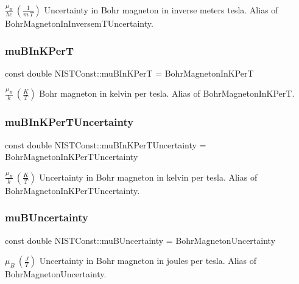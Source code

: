$\frac{\mu_B}{hc} \ (\frac{1}{m\ T})$ Uncertainty in Bohr magneton in inverse meters tesla. Alias of Bohr\+Magneton\+In\+Inversem\+T\+Uncertainty. \mbox{\label{group___bohr_magneton_ga51473ab154d1c4e8e9afca84952db156}} 
\subsubsection{\texorpdfstring{mu\+B\+In\+K\+PerT}{muBInKPerT}}
{\footnotesize\ttfamily const double N\+I\+S\+T\+Const\+::mu\+B\+In\+K\+PerT = Bohr\+Magneton\+In\+K\+PerT}

$\frac{\mu_B}{k} \ (\frac{K}{T})$ Bohr magneton in kelvin per tesla. Alias of Bohr\+Magneton\+In\+K\+PerT. \mbox{\label{group___bohr_magneton_ga3e329894e17506d60948fd563cee0368}} 
\subsubsection{\texorpdfstring{mu\+B\+In\+K\+Per\+T\+Uncertainty}{muBInKPerTUncertainty}}
{\footnotesize\ttfamily const double N\+I\+S\+T\+Const\+::mu\+B\+In\+K\+Per\+T\+Uncertainty = Bohr\+Magneton\+In\+K\+Per\+T\+Uncertainty}

$\frac{\mu_B}{k} \ (\frac{K}{T})$ Uncertainty in Bohr magneton in kelvin per tesla. Alias of Bohr\+Magneton\+In\+K\+Per\+T\+Uncertainty. \mbox{\label{group___bohr_magneton_ga6f7d483b5984d92f63b7fbe199fa3985}} 
\subsubsection{\texorpdfstring{mu\+B\+Uncertainty}{muBUncertainty}}
{\footnotesize\ttfamily const double N\+I\+S\+T\+Const\+::mu\+B\+Uncertainty = Bohr\+Magneton\+Uncertainty}

$\mu_B \ (\frac{J}{T})$ Uncertainty in Bohr magneton in joules per tesla. Alias of Bohr\+Magneton\+Uncertainty. 